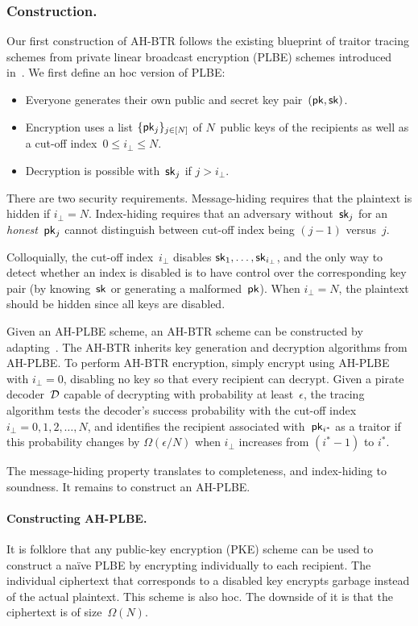 \subsubsection{Construction.}
Our first construction of AH-BTR follows the existing blueprint of traitor tracing schemes from private linear broadcast encryption (PLBE) schemes introduced in~\cite{EC:BonSahWat06}.
We first define an \ad hoc version of PLBE:
\begin{itemize}
\item Everyone generates their own public and secret key pair~$(\pk,\sk)$.
\item Encryption uses a list $\{\pk_j\}_{j\in[N]}$ of $N$~public keys of the recipients as well as a cut-off index~${0\leq i_\bot\leq N}$.
\item Decryption is possible with~$\sk_j$ if ${j>i_\bot}$.
\end{itemize}
There are two security requirements.
Message-hiding requires that the plaintext is hidden if ${i_\bot=N}$.
Index-hiding requires that an adversary without~$\sk_j$ for an \emph{honest}~$\pk_j$ cannot distinguish between cut-off index being ${(j-1)}$ versus~$j$.

Colloquially, the cut-off index~$i_\bot$ disables $\sk_1,\dots,\sk_{i_\bot}$, and
the only way to detect whether an index is disabled is to have control over the corresponding key pair (by knowing~$\sk$ or generating a malformed~$\pk$).
When ${i_\bot=N}$, the plaintext should be hidden since all keys are disabled.

Given an AH-PLBE scheme, an AH-BTR scheme can be constructed by adapting~\cite{EC:BonSahWat06}.
The AH-BTR inherits key generation and decryption algorithms from AH-PLBE.
To perform AH-BTR encryption, simply encrypt using AH-PLBE with ${i_\bot=0}$, disabling no key so that every recipient can decrypt.
Given a pirate decoder~${\mathcal{D}}$ capable of decrypting with probability at least~$\epsilon$, the tracing algorithm tests the decoder's success probability with the cut-off index ${i_\bot=0,1},\allowbreak{2,\dots,N}$, and identifies the recipient associated with~$\pk_{i^\ast}$ as a traitor if this probability changes by $\Omega(\epsilon/N)$ when $i_\bot$ increases from $({i^\ast-1})$ to $i^\ast$.

The message-hiding property translates to completeness, and index-hiding to soundness.
It remains to construct an AH-PLBE.

\paragraph{Constructing AH-PLBE.}
It is folklore that any public-key encryption (PKE) scheme can be used to construct a na{\"i}ve PLBE by encrypting individually to each recipient.
The individual ciphertext that corresponds to a disabled key encrypts garbage instead of the actual plaintext.
This scheme is also \ad hoc.
The downside of it is that the ciphertext is of size~$\Omega(N)$.

